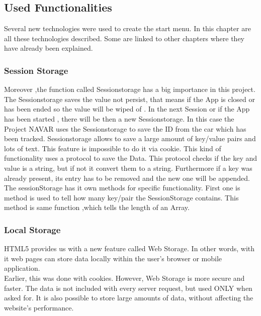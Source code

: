 \subsection{Used Functionalities}
Several new technologies were used to create the start menu. In this chapter are all these technologies described. Some are linked to other chapters where they have already been explained. 
\\

\subsubsection{Session Storage}
Moreover ,the function called Sessionstorage has a big importance in this project. The Sessionstorage saves the value not persist, that means if the App is closed or has been ended so the value will be wiped of . In the next Session or if the App has been started , there will be then a new Sessionstorage. In this case the Project NAVAR uses the Sessionstorage to save the ID from the car which has been tracked. Sessionstorage allows  to save a large amount of  key/value pairs and lots of text. This feature is impossible to do it via cookie. This kind of functionality uses  a protocol to save the Data. This protocol checks if the key and value is a string, but if not it convert them to a string. Furthermore if a key was already present, its entry  has to be removed and the new one will be appended. The sessionStorage has it own methods for specific functionality.
First one is method is used to tell how many key/pair the SessionStorage contains. This method is same function ,which tells the length of an Array.

\subsubsection{Local Storage}

HTML5 provides us with a new feature called Web Storage. In other words, with it web pages can store data locally within the user's browser or mobile application.
\\

Earlier, this was done with cookies. However, Web Storage is more secure and faster. The data is not included with every server request, but used ONLY when asked for. It is also possible to store large amounts of data, without affecting the website's performance.\cite{w3school}
\\

